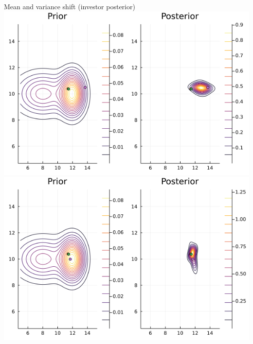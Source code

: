 \documentclass[
  ignorenonframetext,
]{beamer}
\begin{document}
\begin{frame}{Mean and variance shift (investor posterior)}
\protect\hypertarget{mean-and-variance-shift-investor-posterior}{}
\includegraphics[width=0.4\paperwidth]{complexity_files/figure-beamer/unnamed-chunk-13-1}
\includegraphics[width=0.4\paperwidth]{complexity_files/figure-beamer/unnamed-chunk-13-2}
\end{frame}
\end{document}
